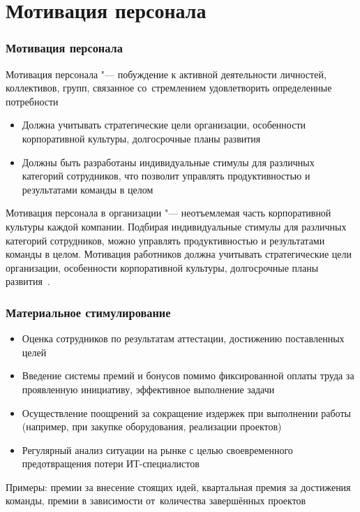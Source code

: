 \documentclass{../industrial-development}
\begin{document}
\section{Мотивация персонала}
\begin{frame} \frametitle{Мотивация персонала}
	
	\alert{Мотивация персонала} "--- побуждение к активной деятельности личностей, коллективов, групп, связанное со~стремлением удовлетворить определенные потребности
	\begin{itemize}
		\item Должна учитывать стратегические цели организации, особенности корпоративной культуры, долгосрочные планы развития
		\item Должны быть разработаны индивидуальные стимулы для различных категорий сотрудников, что позволит управлять продуктивностью и результатами команды в целом 
	\end{itemize}
\end{frame}

\lecturenotes

Мотивация персонала в организации "--- неотъемлемая часть корпоративной культуры каждой компании. Подбирая индивидуальные стимулы для различных категорий сотрудников, можно управлять продуктивностью и результатами команды в целом. Мотивация работников должна учитывать стратегические цели организации, особенности корпоративной культуры, долгосрочные планы развития~\cite{MotivPerson}.

\begin{frame} \frametitle{Материальное стимулирование}
	
	\begin{itemize}
		\item Оценка сотрудников по результатам аттестации, достижению поставленных целей
		\item Введение системы премий и бонусов помимо фиксированной оплаты труда за проявленную инициативу, эффективное выполнение задачи
		\item  Осуществление поощрений за сокращение издержек при выполнении работы (например, при закупке оборудования, реализации проектов)
		\item  Регулярный анализ ситуации на рынке с целью своевременного предотвращения потери ИТ-специалистов
	\end{itemize}
	Примеры: премии за внесение стоящих идей, квартальная премия за достижения команды, премии в зависимости от~количества завершённых проектов
\end{frame}
\lecturenotes
\end{document}

